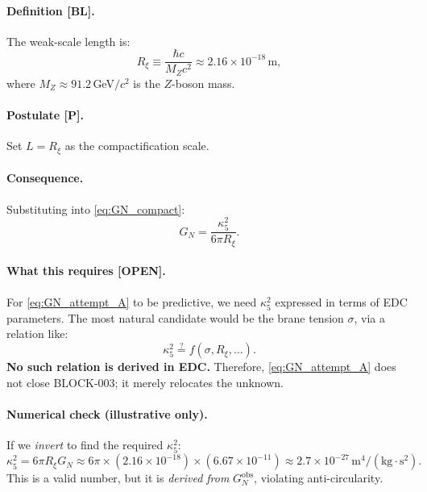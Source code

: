 \documentclass[11pt,a4paper]{article}
\newcommand{\tagBL}{\textcolor{blue!70!black}{[BL]}}
\newcommand{\tagP}{\textcolor{orange!80!black}{[P]}}
\newcommand{\tagOPEN}{\textcolor{red!70!black}{[OPEN]}}
\begin{document}
\paragraph{Definition \tagBL{}.}
The weak-scale length is:
\begin{equation}
    R_\xi \equiv \frac{\hbar c}{M_Z c^2} \approx 2.16 \times 10^{-18}\,\text{m},
    \label{eq:Rxi_def}
\end{equation}
where $M_Z \approx 91.2$\,GeV$/c^2$ is the $Z$-boson mass.

\paragraph{Postulate \tagP{}.}
Set $L = R_\xi$ as the compactification scale.

\paragraph{Consequence.}
Substituting into \eqref{eq:GN_compact}:
\begin{equation}
    G_N = \frac{\kappa_5^2}{6\pi R_\xi}.
    \label{eq:GN_attempt_A}
\end{equation}

\paragraph{What this requires \tagOPEN{}.}
For \eqref{eq:GN_attempt_A} to be predictive, we need $\kappa_5^2$ expressed in terms of EDC parameters.
The most natural candidate would be the brane tension $\sigma$, via a relation like:
\begin{equation}
    \kappa_5^2 \stackrel{?}{=} f(\sigma, R_\xi, \ldots).
    \label{eq:kappa5_unknown}
\end{equation}
\textbf{No such relation is derived in EDC.}
Therefore, \eqref{eq:GN_attempt_A} does not close BLOCK-003; it merely relocates the unknown.

\paragraph{Numerical check (illustrative only).}
If we \emph{invert} to find the required $\kappa_5^2$:
\begin{equation}
    \kappa_5^2 = 6\pi R_\xi G_N \approx 6\pi \times (2.16 \times 10^{-18}) \times (6.67 \times 10^{-11}) \approx 2.7 \times 10^{-27}\,\text{m}^4/(\text{kg}\cdot\text{s}^2).
\end{equation}
This is a valid number, but it is \emph{derived from} $G_N^{\text{obs}}$, violating anti-circularity.
\end{document}
